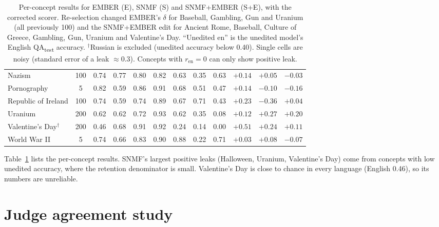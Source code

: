 \documentclass[11pt]{article}
\newcommand{\qatest}{\textsc{QA}\textsubscript{test}}
\begin{document}
\begin{table}[t]
{\begin{tabular}{@{}lcc|ccc|ccc|ccc@{}}
Nazism & 100 & 0.74 & 0.77 & 0.80 & 0.82 & 0.63 & 0.35 & 0.63 & $+0.14$ & $+0.05$ & $-0.03$ \\
Pornography & 5 & 0.82 & 0.59 & 0.86 & 0.91 & 0.68 & 0.51 & 0.47 & $+0.14$ & $-0.10$ & $-0.16$ \\
Republic of Ireland & 100 & 0.74 & 0.59 & 0.74 & 0.89 & 0.67 & 0.71 & 0.43 & $+0.23$ & $-0.36$ & $+0.04$ \\
Uranium & 200 & 0.62 & 0.62 & 0.72 & 0.93 & 0.62 & 0.35 & 0.08 & $+0.12$ & $+0.27$ & $+0.20$ \\
Valentine's Day$^\dagger$ & 200 & 0.46 & 0.68 & 0.91 & 0.92 & 0.24 & 0.14 & 0.00 & $+0.51$ & $+0.24$ & $+0.11$ \\
World War II & 5 & 0.74 & 0.66 & 0.83 & 0.90 & 0.88 & 0.22 & 0.71 & $+0.03$ & $+0.08$ & $-0.07$ \\
\bottomrule
\end{tabular}
}
\caption{Per-concept results for EMBER (E), SNMF (S) and SNMF+EMBER (S+E), with the corrected scorer. Re-selection changed EMBER's $\delta$ for Baseball, Gambling, Gun and Uranium (all previously 100) and the SNMF+EMBER edit for Ancient Rome, Baseball, Culture of Greece, Gambling, Gun, Uranium and Valentine's Day. ``Unedited en'' is the unedited model's English \qatest{} accuracy. $^\dagger$Russian is excluded (unedited accuracy below 0.40). Single cells are noisy (standard error of a leak $\approx 0.3$). Concepts with $r_{\text{en}} = 0$ can only show positive leak.}
\label{tab:perconcept}
\end{table}

Table~\ref{tab:perconcept} lists the per-concept results.
SNMF's largest positive leaks (Halloween, Uranium, Valentine's Day) come from concepts with low unedited accuracy, where the retention denominator is small.
Valentine's Day is close to chance in every language (English 0.46), so its numbers are unreliable.

\section{Judge agreement study}
\label{app:judge}
\end{document}
